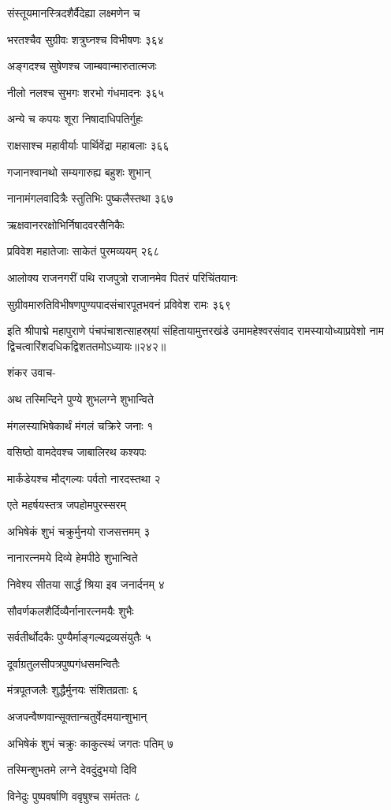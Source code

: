 संस्तूयमानस्त्रिदशैर्वैदेह्या लक्ष्मणेन च

भरतश्चैव सुग्रीवः शत्रुघ्नश्च विभीषणः ३६४

अङ्गदश्च सुषेणश्च जाम्बवान्मारुतात्मजः

नीलो नलश्च सुभगः शरभो गंधमादनः ३६५

अन्ये च कपयः शूरा निषादाधिपतिर्गुहः

राक्षसाश्च महावीर्याः पार्थिवेंद्रा महाबलाः ३६६

गजानश्वानथो सम्यगारुह्य बहुशः शुभान्

नानामंगलवादित्रैः स्तुतिभिः पुष्कलैस्तथा ३६७

ऋक्षवानररक्षोभिर्निषादवरसैनिकैः

प्रविवेश महातेजाः साकेतं पुरमव्ययम् २६८

आलोक्य राजनगरीं पथि राजपुत्रो राजानमेव पितरं परिचिंतयानः

सुग्रीवमारुतिविभीषणपुण्यपादसंचारपूतभवनं प्रविवेश रामः ३६९

इति श्रीपाद्मे महापुराणे पंचपंचाशत्साहस्र्यां संहितायामुत्तरखंडे उमामहेश्वरसंवाद रामस्यायोध्याप्रवेशो नाम द्विचत्वारिंशदधिकद्विशततमोऽध्यायः॥२४२॥


शंकर उवाच-

अथ तस्मिन्दिने पुण्ये शुभलग्ने शुभान्विते

मंगलस्याभिषेकार्थं मंगलं चक्रिरे जनाः १

वसिष्ठो वामदेवश्च जाबालिरथ कश्यपः

मार्कंडेयश्च मौद्गल्यः पर्वतो नारदस्तथा २

एते महर्षयस्तत्र जपहोमपुरस्सरम्

अभिषेकं शुभं चक्रुर्मुनयो राजसत्तमम् ३

नानारत्नमये दिव्ये हेमपीठे शुभान्विते

निवेश्य सीतया सार्द्धं श्रिया इव जनार्दनम् ४

सौवर्णकलशैर्दिव्यैर्नानारत्नमयैः शुभैः

सर्वतीर्थोदकैः पुण्यैर्माङ्गल्यद्रव्यसंयुतैः ५

दूर्वाग्रतुलसीपत्रपुष्पगंधसमन्वितैः

मंत्रपूतजलैः शुद्धैर्मुनयः संशितव्रताः ६

अजपन्वैष्णवान्सूक्तान्चतुर्वेदमयान्शुभान्

अभिषेकं शुभं चक्रुः काकुत्स्थं जगतः पतिम् ७

तस्मिन्शुभतमे लग्ने देवदुंदुभयो दिवि

विनेदुः पुष्पवर्षाणि ववृषुश्च समंततः ८


